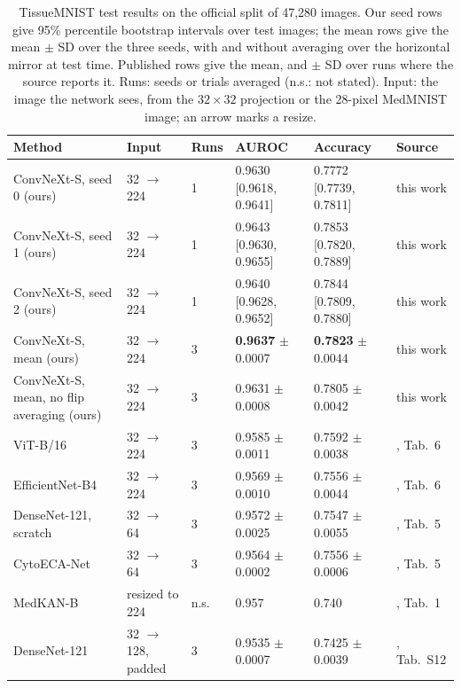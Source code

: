\begin{table}[t]
\caption{TissueMNIST test results on the official split of 47,280 images. Our seed rows give 95\% percentile bootstrap intervals over test images; the mean rows give the mean $\pm$ SD over the three seeds, with and without averaging over the horizontal mirror at test time. Published rows give the mean, and $\pm$ SD over runs where the source reports it. Runs: seeds or trials averaged (n.s.: not stated). Input: the image the network sees, from the $32\times32$ projection or the 28-pixel MedMNIST image; an arrow marks a resize.}
\label{tab:main}
\centering
\footnotesize
\setlength{\tabcolsep}{4pt}
\begin{tabular}{@{}llllll@{}}
\toprule
Method & Input & Runs & AUROC & Accuracy & Source \\
\midrule
ConvNeXt-S, seed 0 (ours) & 32 $\rightarrow$ 224 & 1 & 0.9630 [0.9618, 0.9641] & 0.7772 [0.7739, 0.7811] & this work \\
ConvNeXt-S, seed 1 (ours) & 32 $\rightarrow$ 224 & 1 & 0.9643 [0.9630, 0.9655] & 0.7853 [0.7820, 0.7889] & this work \\
ConvNeXt-S, seed 2 (ours) & 32 $\rightarrow$ 224 & 1 & 0.9640 [0.9628, 0.9652] & 0.7844 [0.7809, 0.7880] & this work \\
ConvNeXt-S, mean (ours) & 32 $\rightarrow$ 224 & 3 & \textbf{0.9637} $\pm$ 0.0007 & \textbf{0.7823} $\pm$ 0.0044 & this work \\
ConvNeXt-S, mean, no flip averaging (ours) & 32 $\rightarrow$ 224 & 3 & 0.9631 $\pm$ 0.0008 & 0.7805 $\pm$ 0.0042 & this work \\
\midrule
ViT-B/16 & 32 $\rightarrow$ 224 & 3 & 0.9585 $\pm$ 0.0011 & 0.7592 $\pm$ 0.0038 & \cite{wu2025rethinking}, Tab.~6 \\
EfficientNet-B4 & 32 $\rightarrow$ 224 & 3 & 0.9569 $\pm$ 0.0010 & 0.7556 $\pm$ 0.0044 & \cite{wu2025rethinking}, Tab.~6 \\
DenseNet-121, scratch & 32 $\rightarrow$ 64 & 3 & 0.9572 $\pm$ 0.0025 & 0.7547 $\pm$ 0.0055 & \cite{arman2026cytoecanet}, Tab.~5 \\
CytoECA-Net & 32 $\rightarrow$ 64 & 3 & 0.9564 $\pm$ 0.0002 & 0.7556 $\pm$ 0.0006 & \cite{arman2026cytoecanet}, Tab.~5 \\
MedKAN-B & resized to 224 & n.s. & 0.957 & 0.740 & \cite{yang2025medkan}, Tab.~1 \\
DenseNet-121 & 32 $\rightarrow$ 128, padded & 3 & 0.9535 $\pm$ 0.0007 & 0.7425 $\pm$ 0.0039 & \cite{doerrich2025medmnistplus}, Tab.~S12 \\

\end{tabular}
\end{table}

